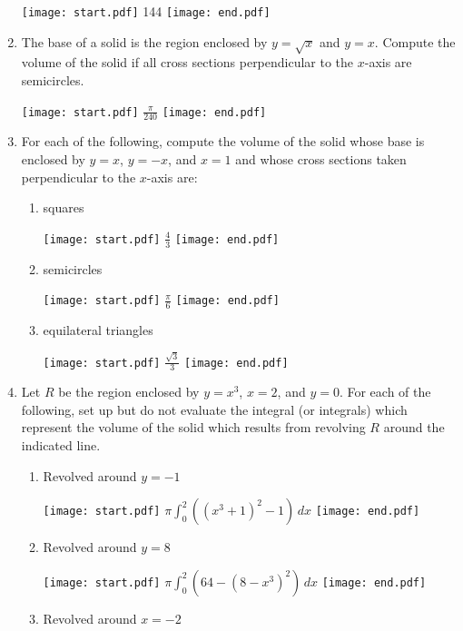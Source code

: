 \documentclass[12pt]{article}
\begin{document}
\begin{enumerate}
\texttt{[image: start.pdf]}
{{144}}
\texttt{[image: end.pdf]}


\item The base of a solid is the region enclosed by $y=\sqrt{x}$ and $y=x$.  Compute the volume of the solid if all cross sections perpendicular to the $x$-axis are semicircles.

\texttt{[image: start.pdf]}
{{$\frac{\pi}{240}$}}
\texttt{[image: end.pdf]}


\item For each of the following, compute the volume of the solid whose base is enclosed by $y=x$, $y=-x$, and $x=1$  and whose cross sections taken perpendicular to the $x$-axis are:

\begin{enumerate}

\item squares

\texttt{[image: start.pdf]}
{{$\frac{4}{3}$}}
\texttt{[image: end.pdf]}


\item semicircles

\texttt{[image: start.pdf]}
{{$\frac{\pi}{6}$}}
\texttt{[image: end.pdf]}


\item equilateral triangles

\texttt{[image: start.pdf]}
{{$\frac{\sqrt{3}}{3}$}}
\texttt{[image: end.pdf]}


\end{enumerate}

\item Let $R$ be the region enclosed by $y=x^3$, $x=2$, and $y=0$.  For each of the following, set up but do not evaluate the integral (or integrals) which represent the volume of the solid which results from revolving $R$ around the indicated line.

\begin{enumerate}

\item Revolved around $y=-1$

\texttt{[image: start.pdf]}
{{$\pi \int_0^2 \left((x^3+1)^2-1\right) \,dx$}}
\texttt{[image: end.pdf]}


\item Revolved around $y=8$

\texttt{[image: start.pdf]}
{{$\pi \int_0^2 \left(64-(8-x^3)^2\right) \,dx$}}
\texttt{[image: end.pdf]}


\item Revolved around $x=-2$


\end{enumerate}
\end{enumerate}
\end{document}
